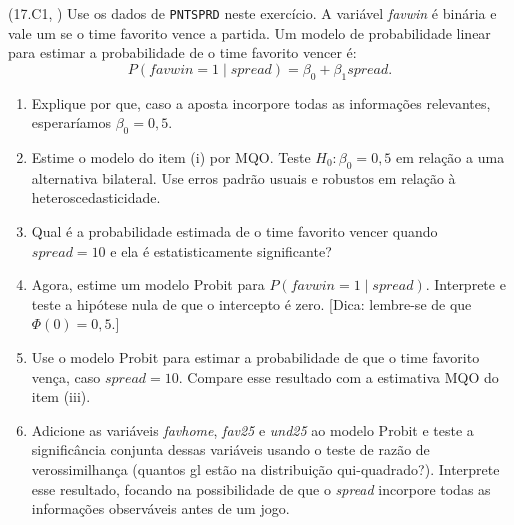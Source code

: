 \documentclass[12pt,letterpaper,onecolumn]{exam}
\begin{document}
\begin{questions}
\vspace{0.7cm}

\question\qstar (17.C1, \citep{wooldridge2016}) Use os dados de \texttt{PNTSPRD} neste exercício. A variável \textit{favwin} é binária e vale um se o time favorito vence a partida. Um modelo de probabilidade linear para estimar a probabilidade de o time favorito vencer é:
\[
P(favwin=1\mid spread)=\beta_0+\beta_1 spread.
\]
\begin{enumerate}[label=(\roman*)]
    \item Explique por que, caso a aposta incorpore todas as informações relevantes, esperaríamos \(\beta_0=0{,}5\).
    \item Estime o modelo do item (i) por MQO. Teste \(H_0:\beta_0=0{,}5\) em relação a uma alternativa bilateral. Use erros padrão usuais e robustos em relação à heteroscedasticidade.
    \item Qual é a probabilidade estimada de o time favorito vencer quando \(spread=10\) e ela é estatisticamente significante?
    \item Agora, estime um modelo Probit para \(P(favwin=1\mid spread)\). Interprete e teste a hipótese nula de que o intercepto é zero. [Dica: lembre-se de que \(\Phi(0)=0{,}5\).]
    \item Use o modelo Probit para estimar a probabilidade de que o time favorito vença, caso \(spread=10\). Compare esse resultado com a estimativa MQO do item (iii).
    \item Adicione as variáveis \textit{favhome}, \textit{fav25} e \textit{und25} ao modelo Probit e teste a significância conjunta dessas variáveis usando o teste de razão de verossimilhança (quantos gl estão na distribuição qui-quadrado?). Interprete esse resultado, focando na possibilidade de que o \textit{spread} incorpore todas as informações observáveis antes de um jogo.
\end{enumerate}

\end{questions}



\end{document}
